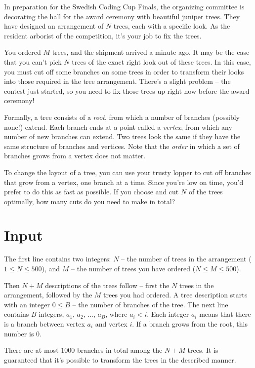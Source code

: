 In preparation for the Swedish Coding Cup Finals, the organizing committee is decorating the hall for the award ceremony with beautiful juniper trees.
They have designed an arrangement of $N$ trees, each with a specific look.
As the resident arborist of the competition, it's your job to fix the trees.

You ordered $M$ trees, and the shipment arrived a minute ago.
It may be the case that you can't pick $N$ trees of the exact right look out of these trees.
In this case, you must cut off some branches on some trees in order to transform their looks into those required in the tree arrangement.
There's a slight problem -- the contest just started, so you need to fix those trees up right now before the award ceremony!

Formally, a tree consists of a \emph{root}, from which a number of branches (possibly none!) extend.
Each branch ends at a point called a \emph{vertex}, from which any number of new branches can extend.
Two trees look the same if they have the same structure of branches and vertices.
Note that the \emph{order} in which a set of branches grows from a vertex does not matter.

To change the layout of a tree, you can use your trusty lopper to cut off branches that grow from a vertex, one branch at a time.
Since you're low on time, you'd prefer to do this as fast as possible.
If you choose and cut $N$ of the trees optimally, how many cuts do you need to make in total?

\section*{Input}
The first line contains two integers:
  $N$ -- the number of trees in the arrangement ($1 \le N \le 500$), and
  $M$ -- the number of trees you have ordered ($N \le M \le 500$).

Then $N + M$ descriptions of the trees follow -- first the $N$ trees in the arrangement, followed by the $M$ trees you had ordered.
A tree description starts with an integer $0 \le B$ -- the number of branches of the tree.
The next line contains $B$ integers, $a_1$, $a_2$, ..., $a_B$, where $a_i < i$.
Each integer $a_i$ means that there is a branch between vertex $a_i$ and vertex $i$.
If a branch grows from the root, this number is $0$.

There are at most $1000$ branches in total among the $N + M$ trees.
It is guaranteed that it's possible to transform the trees in the described manner.

